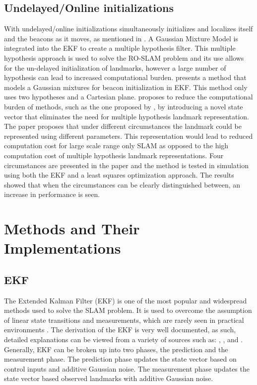 \documentclass[conference]{IEEEtran}
\begin{document}
		\subsection{Undelayed/Online initializations}
			With undelayed/online initializations simultaneously initializes and localizes itself and the beacons as it moves, as mentioned in \cite{Caballero2010}. A Gaussian Mixture Model is integrated into the EKF to create a multiple hypothesis filter.  This multiple hypothesis approach is used to solve the RO-SLAM problem and its use allows for the un-delayed initialization of landmarks, however a large number of hypothesis can lead to increased computational burden. \cite{Geneve2015} presents a method that models a Gaussian mixtures for beacon initialization in EKF. This method only uses two hypotheses and a Cartesian plane. \cite{Ahmad2011a} proposes to reduce the computational burden of methods, such as the one proposed by \cite{Caballero2010}, by introducing a novel state vector that eliminates the need for multiple hypothesis landmark representation. The paper proposes that under different circumstances the landmark could be represented using different parameters. This representation would lead to reduced computation cost for large scale range only SLAM as opposed to the high computation cost of multiple hypothesis landmark representations. Four circumstances are presented in the paper and the method is tested in simulation using both the EKF and a least squares optimization approach. The results showed that when the circumstances can be clearly distinguished between, an increase in performance is seen.



	
	

	\section{Methods and Their Implementations}
	\label{methods and their implementations}
	
	\subsection{EKF}
	
	
	
	The Extended Kalman Filter (EKF) is one of the most popular and widespread methods used to solve the SLAM problem. It is used to overcome the assumption of linear state transitions and measurements, which are rarely seen in practical environments \cite{Thrun2002}. The derivation of the EKF is very well documented, as such, detailed explanations can be viewed from a variety of sources such as: \cite{Thrun2002}, \cite{Ribeiro2004}, and \cite{Haykin2001}. Generally, EKF can be broken up into two phases, the prediction and the measurement phase. The prediction phase updates the state vector based on control inputs and additive Gaussian noise. The measurement phase updates the state vector based observed landmarks with additive Gaussian noise.
	
\end{document}
